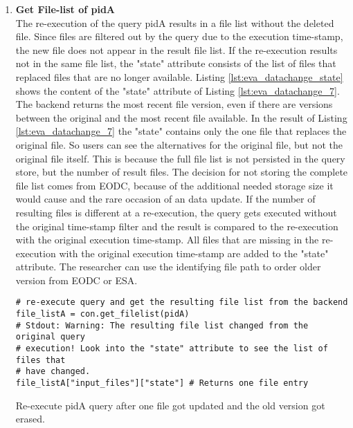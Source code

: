 \documentclass[draft,final]{vutinfth} %
\newenvironment{code}{\captionsetup{type=listing}}{}
\begin{document}
\begin{enumerate}
	\item \textbf{Get File-list of pidA}\\ 
	The re-execution of the query pidA results in a file list without the deleted file. Since files are filtered out by the query due to the execution time-stamp, the new file does not appear in the result file list. If the re-execution results not in the same file list, the "state" attribute consists of the list of files that replaced files that are no longer available. Listing \ref{lst:eva_datachange_state} shows the content of the "state" attribute of Listing \ref{lst:eva_datachange_7}. The backend returns the most recent file version, even if there are versions between the original and the most recent file available. In the result of Listing \ref{lst:eva_datachange_7} the "state" contains only the one file that replaces the original file. So users can see the alternatives for the original file, but not the original file itself. This is because the full file list is not persisted in the query store, but the number of result files. The decision for not storing the complete file list comes from EODC, because of the additional needed storage size it would cause and the rare occasion of an data update. If the number of resulting files is different at a re-execution, the query gets executed without the original time-stamp filter and the result is compared to the re-execution with the original execution time-stamp. All files that are missing in the re-execution with the original execution time-stamp are added to the "state" attribute. The researcher can use the identifying file path to order older version from EODC or ESA.   
	\begin{code}
		\begin{verbatim}
# re-execute query and get the resulting file list from the backend
file_listA = con.get_filelist(pidA)
# Stdout: Warning: The resulting file list changed from the original query
# execution! Look into the "state" attribute to see the list of files that
# have changed. 
file_listA["input_files"]["state"] # Returns one file entry
		\end{verbatim}
		\caption{Re-execute pidA query after one file got updated and the old version got erased.}
		\label{lst:eva_datachange_7}
	\end{code}	
	
	

\end{enumerate}
\end{document}
